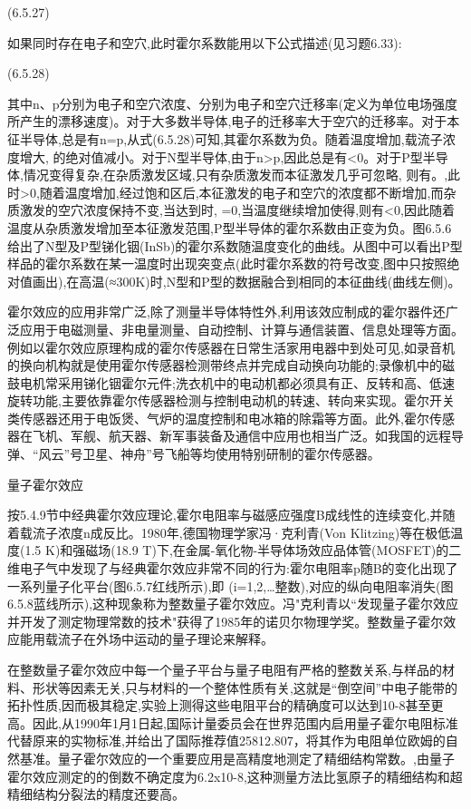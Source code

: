  	(6.5.27)

如果同时存在电子和空穴,此时霍尔系数能用以下公式描述(见习题6.33):

 	(6.5.28)

其中n、p分别为电子和空穴浓度、分别为电子和空穴迁移率(定义为单位电场强度所产生的漂移速度)。对于大多数半导体,电子的迁移率大于空穴的迁移率。对于本征半导体,总是有n=p,从式(6.5.28)可知,其霍尔系数为负。随着温度增加,载流子浓度增大, 的绝对值减小。对于N型半导体,由于n>p,因此总是有<0。对于P型半导体,情况变得复杂,在杂质激发区域,只有杂质激发而本征激发几乎可忽略, 则有。,此时>0,随着温度增加,经过饱和区后,本征激发的电子和空穴的浓度都不断增加,而杂质激发的空穴浓度保持不变,当达到时, =0,当温度继续增加使得,则有<0,因此随着温度从杂质激发增加至本征激发范围,P型半导体的霍尔系数由正变为负。图6.5.6给出了N型及P型锑化铟(InSb)的霍尔系数随温度变化的曲线。从图中可以看出P型样品的霍尔系数在某一温度时出现突变点(此时霍尔系数的符号改变,图中只按照绝对值画出),在高温(≈300K)时,N型和P型的数据融合到相同的本征曲线(曲线左侧)。



霍尔效应的应用非常广泛,除了测量半导体特性外,利用该效应制成的霍尔器件还广泛应用于电磁测量、非电量测量、自动控制、计算与通信装置、信息处理等方面。例如以霍尔效应原理构成的霍尔传感器在日常生活家用电器中到处可见,如录音机的换向机构就是使用霍尔传感器检测带终点并完成自动换向功能的;录像机中的磁鼓电机常采用锑化铟霍尔元件;洗衣机中的电动机都必须具有正、反转和高、低速旋转功能,主要依靠霍尔传感器检测与控制电动机的转速、转向来实现。霍尔开关类传感器还用于电饭煲、气炉的温度控制和电冰箱的除霜等方面。此外,霍尔传感器在飞机、军舰、航天器、新军事装备及通信中应用也相当广泛。如我国的远程导弹、“风云”号卫星、神舟”号飞船等均使用特别研制的霍尔传感器。

量子霍尔效应

按5.4.9节中经典霍尔效应理论,霍尔电阻率与磁感应强度B成线性的连续变化,并随着载流子浓度n成反比。1980年,德国物理学家冯·克利青(Von Klitzing)等在极低温度(1.5 K)和强磁场(18.9 T)下,在金属-氧化物-半导体场效应品体管(MOSFET)的二维电子气中发现了与经典霍尔效应非常不同的行为:霍尔电阻率p随B的变化出现了一系列量子化平台(图6.5.7红线所示),即 (i=1,2,…整数),对应的纵向电阻率消失(图6.5.8蓝线所示),这种现象称为整数量子霍尔效应。冯"克利青以“发现量子霍尔效应并开发了测定物理常数的技术"获得了1985年的诺贝尔物理学奖。整数量子霍尔效应能用载流子在外场中运动的量子理论来解释。

在整数量子霍尔效应中每一个量子平台与量子电阻有严格的整数关系,与样品的材料、形状等因素无关,只与材料的一个整体性质有关,这就是“倒空间”中电子能带的拓扑性质,因而极其稳定,实验上测得这些电阻平台的精确度可以达到10-8甚至更高。因此,从1990年1月1日起,国际计量委员会在世界范围内启用量子霍尔电阻标准代替原来的实物标准,并给出了国际推荐值25812.807，将其作为电阻单位欧姆的自然基准。量子霍尔效应的一个重要应用是高精度地测定了精细结构常数。,由量子霍尔效应测定的的倒数不确定度为6.2x10-8,这种测量方法比氢原子的精细结构和超精细结构分裂法的精度还要高。

